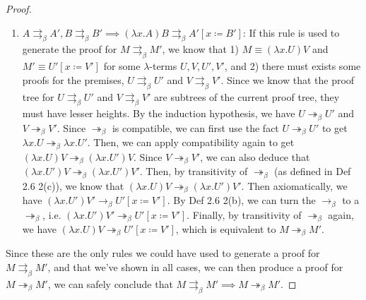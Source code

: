 \documentclass[a4paper,11pt]{article}
\theoremstyle{definition}
\theoremstyle{example}
\theoremstyle{lemma}
\newcommand{\lamterm}[2]{\lambda #1. #2}
\newcommand{\subs}[3]{#1[#2\coloneqq#3]}
\newcommand{\ssbr}{\rightarrow_{\beta}}
\newcommand{\msbr}{\twoheadrightarrow_{\beta}}
\newcommand{\pbr}{\rightrightarrows_{\beta}}
\begin{document}
\begin{proof}
\begin{enumerate}[topsep=2pt,itemsep=-0.5ex,partopsep=1ex,parsep=1ex]
     \item $A \pbr A', B \pbr B' \implies (\lamterm{x}{A})B \pbr \subs{A'}{x}{B'}$: If this rule is used to generate the proof for $M \pbr M'$, we know that 1) $M \equiv (\lamterm{x}{U})V$ and $M' \equiv \subs{U'}{x}{V'}$ for some $\lambda$-terms $U, V, U', V'$, and 2) there must exists some proofs for the premises, $U \pbr U'$ and $V \pbr V'$. Since we know that the proof tree for $U \pbr U'$ and $V \pbr V'$ are subtrees of the current proof tree, they must have lesser heights. By the induction hypothesis, we have $U \msbr U'$ and $V \msbr V'$. Since $\msbr$ is compatible, we can first use the fact $U \msbr U'$ to get $\lamterm{x}{U} \msbr \lamterm{x}{U'}$. Then, we can apply compatibility again to get $(\lamterm{x}{U})V \msbr (\lamterm{x}{U'})V$. Since $V \msbr V'$, we can also deduce that $(\lamterm{x}{U'})V \msbr (\lamterm{x}{U'})V'$. Then, by transitivity of $\msbr$ (as defined in Def 2.6 2(c)), we know that $(\lamterm{x}{U})V \msbr (\lamterm{x}{U'})V'$. Then axiomatically, we have $(\lamterm{x}{U'})V' \ssbr \subs{U'}{x}{V'}$. By Def 2.6 2(b), we can turn the $\ssbr$ to a $\msbr$, i.e. $(\lamterm{x}{U'})V' \msbr \subs{U'}{x}{V'}$. Finally, by transitivity of $\msbr$ again, we have $(\lamterm{x}{U})V \msbr \subs{U'}{x}{V'}$, which is equivalent to $M \msbr M'$.
\end{enumerate}
Since these are the only rules we could have used to generate a proof for $M \pbr M'$, and that we've shown in all cases, we can then produce a proof for $M \msbr M'$, we can safely conclude that $M \pbr M' \implies M \msbr M'$.
\end{proof}
\end{document}
